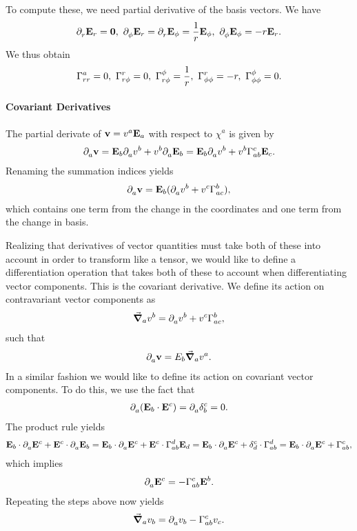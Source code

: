 To compute these, we need partial derivative of the basis vectors. We have
\begin{align*}
	\partial^{}_{r}\vb{E}_{r} = \vb{0},\ \partial^{}_{\phi}\vb{E}_{r} = \partial^{}_{r}\vb{E}_{\phi} = \frac{1}{r}\vb{E}_{\phi},\ \partial^{}_{\phi}\vb{E}_{\phi} = -r\vb{E}_{r}.
\end{align*}
We thus obtain
\begin{align*}
	\chris{a}{r}{r} = 0,\ \chris{r}{r}{\phi} = 0,\ \chris{\phi}{r}{\phi} = \frac{1}{r},\ \chris{r}{\phi}{\phi} = -r,\ \chris{\phi}{\phi}{\phi} = 0.
\end{align*}

\paragraph{Covariant Derivatives}
The partial derivate of $\vb{v} = v^{a}\vb{E}_{a}$ with respect to $\chi^{a}$ is given by
\begin{align*}
	\del{a}{\vb{v}} = \tb{b}\del{a}{v^{b}} + v^{b}\del{a}{\tb{b}} = \tb{b}\del{a}{v^{b}} + v^{b}\chris{c}{a}{b}\tb{c}.
\end{align*}
Renaming the summation indices yields
\begin{align*}
	\del{a}{\vb{v}} = \tb{b}(\del{a}{v^{b}} + v^{c}\chris{b}{a}{c}),
\end{align*}
which contains one term from the change in the coordinates and one term from the change in basis.

Realizing that derivatives of vector quantities must take both of these into account in order to transform like a tensor, we would like to define a differentiation operation that takes both of these to account when differentiating vector components. This is the covariant derivative. We define its action on contravariant vector components as
\begin{align*}
	\dcov{a}{v^{b}} = \del{a}{v^{b}} + v^{c}\chris{b}{a}{c},
\end{align*}
such that
\begin{align*}
	\partial^{}_{a}\vb{v} = E_{b}\grad_{a}{v^{a}}.
\end{align*}
In a similar fashion we would like to define its action on covariant vector components. To do this, we use the fact that
\begin{align*}
	\del{a}{(\tb{b}\cdot\db{c})} = \del{a}{\kdelta{b}{c}} = 0.
\end{align*}
The product rule yields
\begin{align*}
	\tb{b}\cdot\del{a}{\db{c}} + \db{c}\cdot\del{a}{\tb{b}} = \tb{b}\cdot\del{a}{\db{c}} + \db{c}\cdot\chris{d}{a}{b}\tb{d} = \tb{b}\cdot\del{a}{\db{c}} + \kdelta{d}{c}\cdot\chris{d}{a}{b} = \tb{b}\cdot\del{a}{\db{c}} + \chris{c}{a}{b},
\end{align*}
which implies
\begin{align*}
	\del{a}{\db{c}} = -\chris{c}{a}{b}\db{b}.
\end{align*}
Repeating the steps above now yields
\begin{align*}
	\dcov{a}{v_{b}} = \del{a}{v_{b}} - \chris{c}{a}{b}v_{c}.
\end{align*}

